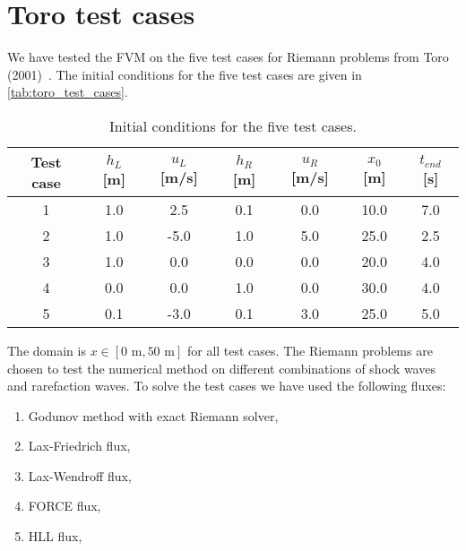 \section{Toro test cases}\label{sec:toro_test_cases}
We have tested the FVM on the five test cases for Riemann problems from Toro (2001)~\cite{Toro2001-Shock}.
The initial conditions for the five test cases are given in \autoref{tab:toro_test_cases}.
\begin{table}[H]
    \centering
    \begin{tabular}{c|c|c|c|c|c|c}
        \hline
        \textbf{Test case} & \textbf{$h_L$} [m] & \textbf{$u_L$} [m/s] & \textbf{$h_R$} [m] & \textbf{$u_R$} [m/s] & \textbf{$x_0$} [m] & \textbf{$t_{end}$} [s] \\
        \hline\hline
        1 & 1.0 & 2.5 & 0.1 & 0.0 & 10.0 & 7.0 \\
        2 & 1.0 & -5.0 & 1.0 & 5.0 & 25.0 & 2.5 \\
        3 & 1.0 & 0.0 & 0.0 & 0.0 & 20.0 & 4.0 \\
        4 & 0.0 & 0.0 & 1.0 & 0.0 & 30.0 & 4.0 \\
        5 & 0.1 & -3.0 & 0.1 & 3.0 & 25.0 & 5.0 \\
        \hline
    \end{tabular}
    \caption{Initial conditions for the five test cases.}\label{tab:toro_test_cases}
\end{table}
The domain is $x \in [0 \text{ m}, 50 \text{ m}]$ for all test cases.
The Riemann problems are chosen to test the numerical method on different combinations of shock waves and rarefaction waves.
To solve the test cases we have used the following fluxes:
\begin{enumerate}
    \item Godunov method with exact Riemann solver,
    \item Lax-Friedrich flux,
    \item Lax-Wendroff flux,
    \item FORCE flux,
    \item HLL flux,
\end{enumerate}

